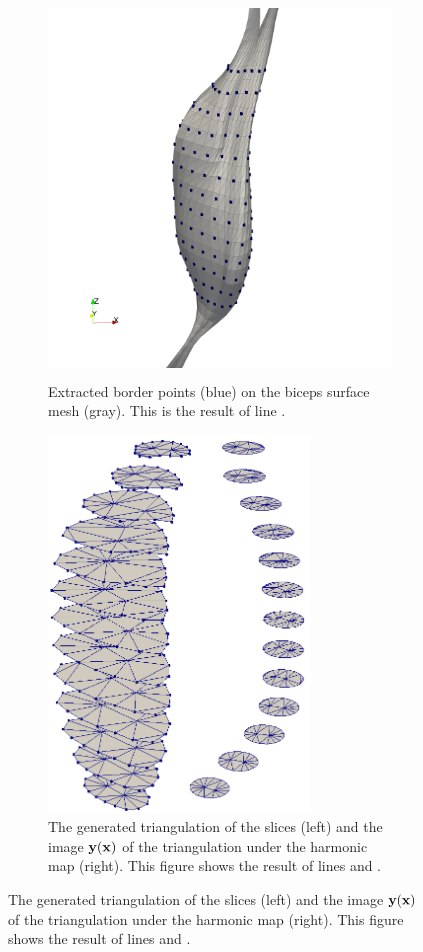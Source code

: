 %
\begin{figure}%
  \centering%
  \begin{subfigure}[t]{0.48\textwidth}%
    \centering%
    \includegraphics[height=10cm]{images/fiber_creation/serial_alg_0.png}%
    \caption{Extracted border points (blue) on the biceps surface mesh (gray). This is the result of line .}%
    \label{fig:serial_alg_0}%
  \end{subfigure}
  \quad
  \begin{subfigure}[t]{0.48\textwidth}%
    \centering%
    \includegraphics[height=10cm]{images/fiber_creation/serial_alg_3.png}%
    \caption{The generated triangulation of the slices (left) and the image $\textbf{y}(\textbf{x})$ of the triangulation under the harmonic map (right). This figure shows the result of lines  and .}%

\end{subfigure}
\end{figure}
